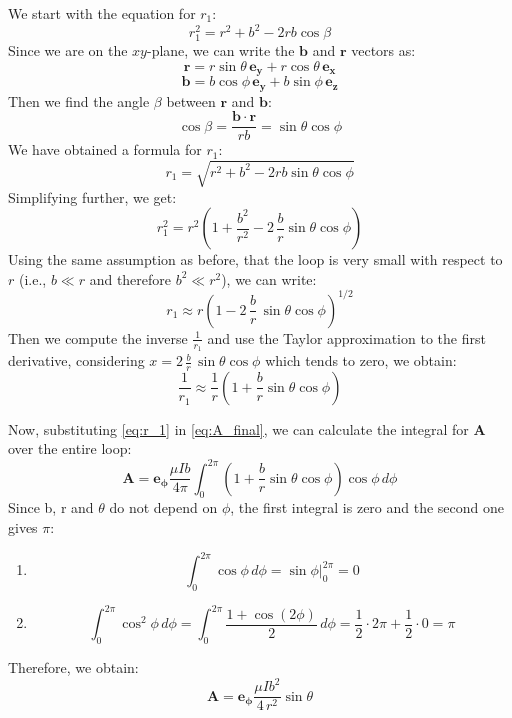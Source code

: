 We start with the equation for \( r_1 \):
$$
r_1^2 = r^2 + b^2 - 2 r b \cos\beta
$$
Since we are on the \( xy \)-plane, we can write the \( \mathbf{b} \) and \( \mathbf{r} \) vectors as:
$$
\mathbf{r} = r \sin \theta \, \mathbf{e_y} + r \cos \theta \, \mathbf{e_x}
$$
$$
\mathbf{b} = b \cos \phi \, \mathbf{e_y} + b \sin \phi \, \mathbf{e_z}
$$
Then we find the angle \(\beta\) between \( \mathbf{r} \) and \( \mathbf{b} \):
$$
\cos \beta = \frac{\mathbf{b} \cdot \mathbf{r}}{r b} = \sin \theta \cos \phi
$$
We have obtained a formula for \( r_1 \):
$$
r_1 = \sqrt{r^2 + b^2 - 2 r b \sin \theta \cos \phi}
$$
Simplifying further, we get:
$$
r_1^2 = r^2 \left( 1 + \frac{b^2}{r^2} - 2\, \frac{ b}{r} \sin \theta \cos \phi \right)
$$
Using the same assumption as before, that the loop is very small with respect to \( r \) (i.e., \( b \ll r \) and therefore \( b^2 \ll r^2 \)), we can write:
$$
r_1 \approx r \left( 1 - 2 \, \frac{ b}{r} \, \sin \theta \cos \phi \right)^{1/2}
$$
Then we compute the inverse \( \frac{1}{r_1} \) and use the Taylor approximation to the first derivative, considering \( x = 2 \, \frac{ b }{r} \, \sin \theta \cos \phi \) which tends to zero, we obtain:
\begin{equation}
    \frac{1}{r_1} \approx \frac{1}{r} \left( 1 + \frac{b}{r} \sin \theta \cos \phi \right)
    \label{eq:r_1}
\end{equation}

Now, substituting \ref{eq:r_1} in \ref{eq:A_final}, we can calculate the integral for \( \mathbf{A} \) over the entire loop:
$$
\mathbf{A} = \mathbf{e_\phi} \frac{\mu I b}{4 \pi} \int_{0}^{2\pi} \left( 1 + \frac{b}{r} \sin \theta \cos \phi \right) \cos \phi \, d\phi
$$
Since b, r and $\theta$ do not depend on $\phi$, the first integral is zero and the second one gives $\pi$:
\begin{enumerate}[label=(\arabic*)]
    \item 
    \parbox{\textwidth}{
    \[
    \int_0^{2\pi} \cos \phi \, d\phi = \sin \phi \Big|_0^{2\pi} = 0
    \]
    }

    \item 
    \parbox{\textwidth}{
    \[
    \int_{0}^{2\pi} \cos^2 \phi \, d\phi = \int_{0}^{2\pi} \frac{1 + \cos(2\phi)}{2} \, d\phi = \frac{1}{2} \cdot 2\pi + \frac{1}{2} \cdot 0 = \pi
    \]
    }
\end{enumerate}
Therefore, we obtain:
\begin{equation}
    \mathbf{A} = \mathbf{e_\phi} \frac{\mu I b^2}{4 \, r^2} \sin \theta
    \label{eq:A_spher}
\end{equation}

